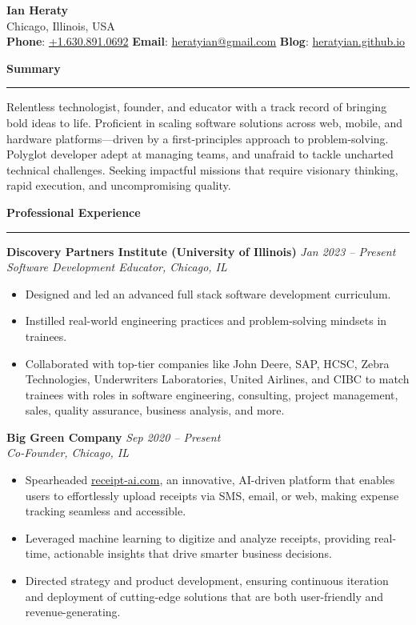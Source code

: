 \documentclass[letterpaper,10pt]{article}
\newcommand{\resheading}[1]{
  \vspace{15pt}
  \textbf{\large #1}
  \vspace{5pt}
  \hrule
  \vspace{10pt}
}
\begin{document}
\begin{center}
    {\LARGE \textbf{Ian Heraty}} \\
    Chicago, Illinois, USA \\
    \textbf{Phone}: \href{tel:+1.630.891.0692}{+1.630.891.0692} \quad\textbullet\quad 
    \textbf{Email}: \href{mailto:heratyian@gmail.com}{heratyian@gmail.com} \quad\textbullet\quad
    \textbf{Blog}: \href{http://heratyian.github.io}{heratyian.github.io}
\end{center}

\resheading{Summary}
Relentless technologist, founder, and educator with a track record of 
bringing bold ideas to life. Proficient in scaling software solutions across 
web, mobile, and hardware platforms—driven by a first-principles approach 
to problem-solving. Polyglot developer adept at 
managing teams, and unafraid to tackle uncharted technical challenges. 
Seeking impactful missions that require visionary thinking, rapid execution, 
and uncompromising quality.

\resheading{Professional Experience}

\textbf{Discovery Partners Institute (University of Illinois)} \hfill \textit{Jan 2023 -- Present}\\
\emph{Software Development Educator, Chicago, IL}\\
\begin{itemize}
  \item Designed and led an advanced full stack software development curriculum.
  \item Instilled real-world engineering practices and problem-solving mindsets in trainees.
  \item Collaborated with top-tier companies like John Deere, SAP, HCSC, Zebra Technologies, Underwriters Laboratories, United Airlines, and CIBC to match trainees with roles in software engineering, consulting, project management, sales, quality assurance, business analysis, and more.
\end{itemize}

\textbf{Big Green Company} \hfill \textit{Sep 2020 -- Present}\\
\emph{Co-Founder, Chicago, IL}\\
\begin{itemize}
    \item Spearheaded \href{https://receipt-ai.com}{receipt-ai.com}, an innovative, AI-driven platform that enables users to effortlessly upload receipts via SMS, email, or web, making expense tracking seamless and accessible.
    \item Leveraged machine learning to digitize and analyze receipts, providing real-time, actionable insights that drive smarter business decisions.
    \item Directed strategy and product development, ensuring continuous iteration and deployment of cutting-edge solutions that are both user-friendly and revenue-generating.
\end{itemize}
\end{document}
